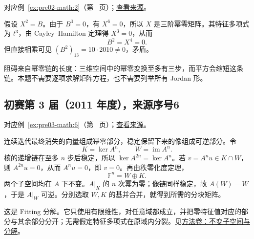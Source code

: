 \documentclass[UTF8,12pt,a4paper,fontset=fandol]{ctexart}
\begin{document}
对应例~\ref{ex:pre02-math:2}（第~\pageref{ex:pre02-math:2} 页）；\href{https://github.com/lzxcr/cmc-mathematics/blob/64916fa1fdbc3e444a652eca204d5669058ee321/src/problems/preliminary/02/02.md}{查看来源}。

\begin{solve}

假设 $X^2=B$。由于 $B^3=0$，有 $X^6=0$，所以 $X$ 是三阶幂零矩阵。其特征多项式为 $t^3$，由 Cayley--Hamilton 定理得 $X^3=0$，从而
\[
B^2=X^4=0.
\]
但直接相乘可见 $(B^2)_{13}=10\cdot2010\ne0$，矛盾。

\end{solve}

\begin{remark}[方法与条件]

阻碍来自幂零链的长度：三维空间中的幂零变换至多有三步，而平方会缩短这条链。本题不需要逐项求解矩阵方程，也不需要列举所有 Jordan 形。

\end{remark}

\subsection{初赛第 3 届（2011 年度），来源序号6}\label{ans:pre03-math:6}\label{pr:pre03-math:6}

对应例~\ref{ex:pre03-math:6}（第~\pageref{ex:pre03-math:6} 页）；\href{https://github.com/lzxcr/cmc-mathematics/blob/64916fa1fdbc3e444a652eca204d5669058ee321/src/problems/preliminary/03/06.md}{查看来源}。

\begin{solve}

连续迭代最终消失的向量组成幂零部分，稳定保留下来的像组成可逆部分。令
\[
K=\ker A^n,\qquad W=\operatorname{im}A^n.
\]
核的递增链在至多 $n$ 步后稳定，所以 $\ker A^{2n}=\ker A^n$。若 $v=A^nu\in K\cap W$，则 $A^{2n}u=0$，从而 $A^nu=0$，即 $v=0$。再由秩零化度定理，
\[
\mathbb F^n=W\oplus K.
\]
两个子空间均在 $A$ 下不变。$A|_K$ 的 $n$ 次幂为零；像链同样稳定，故 $A(W)=W$，于是 $A|_W$ 可逆。分别选取 $W,K$ 的基并合并，就得到所需的分块矩阵。

\end{solve}

\begin{remark}[方法与条件]

这是 Fitting 分解。它只使用有限维性，对任意域都成立，并把零特征值对应的部分与其余部分分开；无需假定特征多项式在原域内分裂。见\hyperref[app:linear-invariant]{方法卷：不变子空间与分解}。

\end{remark}
\end{document}
